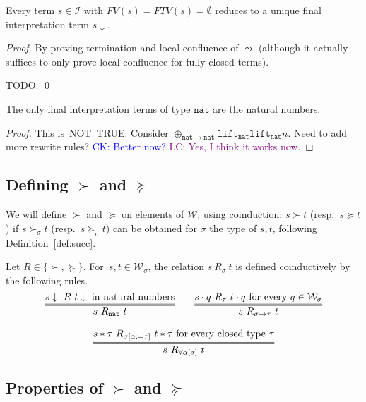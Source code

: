 \documentclass[runningheads,a4paper]{llncs}
\newcommand{\Iterms}{\mathcal{I}}
\newcommand{\World}{\mathcal{W}}
\newcommand{\app}[2]{#1 \cdot #2}
\newcommand{\tapp}[2]{#1 * #2}
\newcommand{\subst}[2]{#1:=#2}
\newcommand{\FTV}{\mathit{FTV}}
\newcommand{\FV}{\mathit{FV}}
\newcommand{\nat}{\mathtt{nat}}
\newcommand{\lift}{\mathtt{lift}}
\newcommand{\da}{\downarrow}
\newcommand{\CK}[1]{\textcolor{blue}{CK: #1}}
\newcommand{\LC}[1]{\textcolor{purple}{LC: #1}}
\begin{document}
\begin{lemma}
Every term $s \in \Iterms$ with $\FV(s) = \FTV(s) = \emptyset$ reduces
to a unique final interpretation term $s\downarrow$.
\end{lemma}

\begin{proof}
By proving termination and local confluence of $\leadsto$ (although it
actually suffices to only prove local confluence for fully closed terms).

TODO.
\qed
\end{proof}

\begin{lemma}
The only final interpretation terms of type $\nat$ are the natural
numbers.
\end{lemma}

\begin{proof}
  This is~NOT~TRUE. Consider
  $\oplus_{\nat\to\nat} \lift_\nat \lift_\nat n$. Need to add more
  rewrite rules?
  \CK{Better now?} \LC{Yes, I think it works now.}
\end{proof}

\subsection{Defining $\succ$ and $\succeq$}

We will define $\succ$ and $\succeq$ on elements of $\World$, using
coinduction: $s \succ t$ (resp.\ $s \succeq t$) if $s \succ_\sigma t$
(resp.\ $s \succeq_\sigma t$) can be obtained for $\sigma$ the type of
$s,t$, following Definition~\ref{def:succ}.

\begin{definition}\label{def:succ}
  Let $R \in \{ \succ,\succeq \}$. For~$s,t \in \World_\sigma$, the
  relation $s\ R_{\sigma}\ t$ is defined coinductively by the
  following rules.
  \[
    \begin{array}{c}
    \infer={s\ R_\nat\ t}{s\da\ R\ t\da \text{ in natural
        numbers}}\quad\quad
    \infer={s\ R_{\sigma\to\tau}\ t}{\app{s}{q}\ R_{\tau}\ \app{t}{q}
      \text{ for every } q \in \World_\sigma} \\ \\
    \infer={s\ R_{\forall\alpha[\sigma]}\ t}{\tapp{s}{\tau}\ R_{\sigma[\subst{\alpha}{\tau}]}\ \tapp{t}{\tau}
      \text{ for every closed type } \tau}
    \end{array}
  \]
\end{definition}

\subsection{Properties of $\succ$ and $\succeq$}
\end{document}
